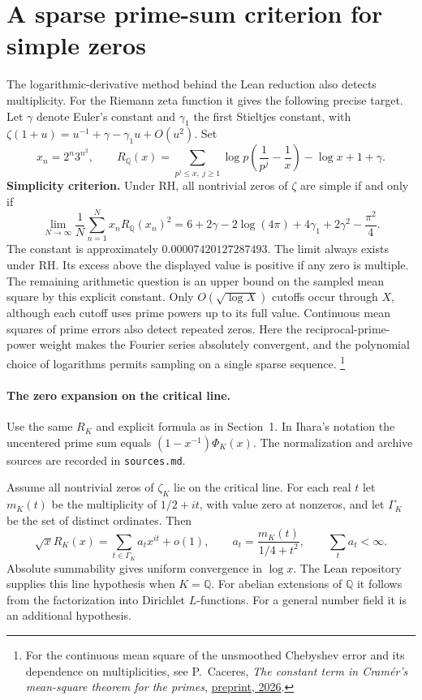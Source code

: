\section{A sparse prime-sum criterion for simple zeros}
\label{sec:sparse-simplicity}

The logarithmic-derivative method behind the Lean reduction also detects
multiplicity. For the Riemann zeta function it gives the following precise
target. Let $\gamma$ denote Euler's constant and $\gamma_1$ the first Stieltjes
constant, with $\zeta(1+u)=u^{-1}+\gamma-\gamma_1u+O(u^2)$. Set
\[
 x_n=2^n3^{n^2},\qquad
 R_{\mathbb Q}(x)=
 \sum_{p^j\le x,\ j\ge1}\log p\left(\frac{1}{p^j}-\frac1x\right)
 -\log x+1+\gamma .
\]
\noindent\textbf{Simplicity criterion.}
Under RH, all nontrivial zeros of $\zeta$ are simple if and only if
\[
 \lim_{N\to\infty}\frac1N\sum_{n=1}^N x_nR_{\mathbb Q}(x_n)^2
 =6+2\gamma-2\log(4\pi)+4\gamma_1+2\gamma^2-\frac{\pi^2}{4}.
\]
The constant is approximately $0.00007420127287493$. The limit always
exists under RH. Its excess above the displayed value is positive if any
zero is multiple. The remaining arithmetic question is an upper bound on
the sampled mean square by this explicit constant. Only
$O(\sqrt{\log X})$ cutoffs occur through $X$, although each cutoff
uses prime powers up to its full value. Continuous mean squares of prime
errors also detect repeated zeros. Here the reciprocal-prime-power
weight makes the Fourier series absolutely convergent, and the polynomial
choice of logarithms permits sampling on a single sparse sequence.
\footnote{For the continuous mean square of the unsmoothed Chebyshev error
and its dependence on multiplicities, see P.~Caceres,
\emph{The constant term in Cramér's mean-square theorem for the primes},
\href{https://hexagonmath.org/2611.01010v1}{preprint, 2026}.}

\paragraph{The zero expansion on the critical line.}
Use the same $R_K$ and explicit formula as in Section~1. In Ihara's notation
the uncentered prime sum equals $(1-x^{-1})\Phi_K(x)$.
The normalization and archive sources are recorded in \texttt{sources.md}.

Assume all nontrivial zeros of $\zeta_K$ lie on the critical line. For each
real $t$ let $m_K(t)$ be the multiplicity of $1/2+it$, with value zero at
nonzeros, and let $\Gamma_K$ be the set of distinct ordinates. Then
\[
 \sqrt{x}R_K(x)=\sum_{t\in\Gamma_K} a_t x^{it}+o(1),
 \qquad a_t=\frac{m_K(t)}{1/4+t^2},\qquad \sum_t a_t<\infty .
\]
Absolute summability gives uniform convergence in $\log x$. The Lean
repository supplies this line hypothesis when $K=\mathbb Q$. For abelian
extensions of $\mathbb Q$ it follows from the factorization into Dirichlet
$L$-functions. For a general number field it is an additional hypothesis.

